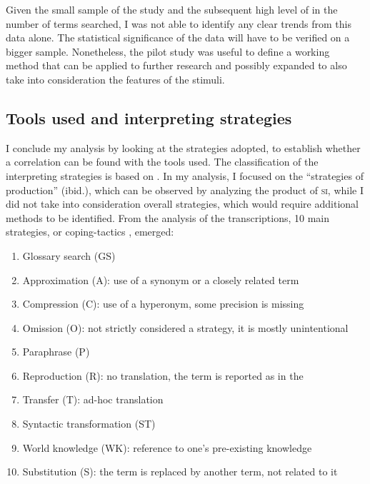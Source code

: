 \documentclass[output=paper]{langsci/langscibook}
\begin{document}
Given the small sample of the study and the subsequent high level of  in the number of terms searched, I was not able to identify any clear trends from this data alone. The statistical significance of the data will have to be verified on a bigger sample. Nonetheless, the pilot study was useful to define a working method that can be applied to further research and possibly expanded to also take into consideration the features of the stimuli. 

\subsection{Tools used and interpreting strategies}\label{sec:prandi:5.3}
I conclude my analysis by looking at the strategies adopted, to establish wheth\-er a correlation can be found with the tools used. The classification of the interpreting strategies is based on \citet{Bartlomiejczyk2006}. In my analysis, I focused on the ``strategies of production'' (ibid.), which can be observed by analyzing the product of \textsc{si}, while I did not take into consideration overall strategies, which would require additional methods to be identified. From the analysis of the transcriptions, 10 main strategies, or coping-tactics \citep{Gile1995}, emerged:

\begin{enumerate}
\item Glossary search (\textsc{GS})
\item Approximation (\textsc{A}): use of a synonym or a closely related term
\item Compression (\textsc{C}): use of a hyperonym, some precision is missing
\item Omission (\textsc{O}): not strictly considered a strategy, it is mostly unintentional
\item Paraphrase (\textsc{P})
\item Reproduction (\textsc{R}): no translation, the term is reported as in the 
\item Transfer (\textsc{T}): ad-hoc translation
\item Syntactic transformation (\textsc{ST})
\item World knowledge (\textsc{WK}): reference to one’s pre-existing knowledge
\item Substitution (\textsc{S}): the term is replaced by another term, not related to it
\end{enumerate}
\end{document}
